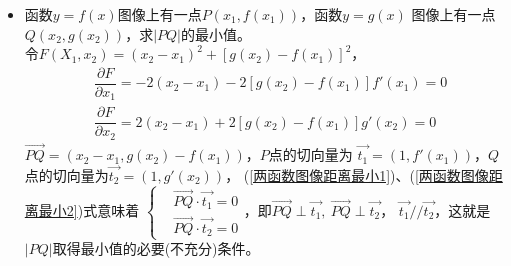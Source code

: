 \begin{itemize}[leftmargin=\inteval{\myitemleftmargin}pt,itemsep=
   \inteval{\myitemitempsep}pt,topsep=\inteval{\myitemtopsep}pt]
\item 函数$ y=f(x) $图像上有一点$ P(x_1,f(x_1)) $，函数$ y=g(x) $
图像上有一点$ Q(x_2,g(x_2)) $，求$ |PQ| $的最小值。\\
令$ F(X_1,x_2)=(x_2-x_1)^2+[g(x_2)-f(x_1)]^2 $，
\begin{align}
    & \dfrac{\partial F}{\partial x_1}=-2(x_2-x_1)-2[g(x_2)-f(x_1)]f'(x_1)=0 
    \label{两函数图像距离最小1}  \\
    & \dfrac{\partial F}{\partial x_2}=2(x_2-x_1)+2[g(x_2)-f(x_1)]g'(x_2)=0
    \label{两函数图像距离最小2}
\end{align}
$ \vec{PQ}=(x_2-x_1,g(x_2)-f(x_1)) $，$ P $点的切向量为
$ \vec{t_1}=(1,f'(x_1)) $，$ Q $点的切向量为$ \vec{t_2}=(1,g'(x_2)) $，
(\ref{两函数图像距离最小1})、(\ref{两函数图像距离最小2})式意味着
$  \left\{ 
\begin{aligned}
    & \vec{PQ}\cdot \vec{t_1} =0 \\
    & \vec{PQ}\cdot \vec{t_2} =0
\end{aligned}
\right. $，即$ \vec{PQ}\perp\vec{t_1},\ \vec{PQ}\perp\vec{t_2} $，
$ \vec{t_1}//\vec{t_2} $，这就是$ |PQ| $取得最小值的必要(不充分)条件。


\end{itemize}
